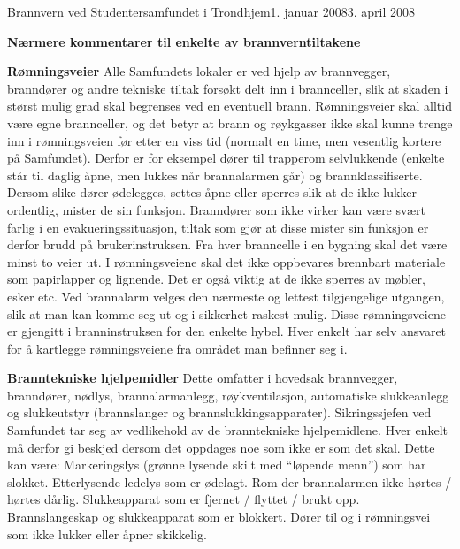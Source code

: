 \begin{instruks}{Brannvern ved Studentersamfundet i Trondhjem}{1. januar 2008}{3. april 2008}
    \begin{center}\textbf{Nærmere kommentarer til enkelte av brannverntiltakene} \end{center}
    \begin{description}
        \item \textbf{Rømningsveier} Alle Samfundets lokaler er ved hjelp av brannvegger, branndører og andre tekniske tiltak
                forsøkt delt inn i brannceller, slik at skaden i størst mulig grad skal begrenses ved en eventuell brann.
                Rømningsveier skal alltid være egne brannceller, og det betyr at brann og røykgasser ikke skal kunne trenge inn i
                rømningsveien før etter en viss tid (normalt en time, men vesentlig kortere på Samfundet). Derfor er for eksempel dører til
                trapperom selvlukkende (enkelte står til daglig åpne, men lukkes når brannalarmen går) og brannklassifiserte.
                Dersom slike dører ødelegges, settes åpne eller sperres slik at de ikke lukker ordentlig, mister de sin funksjon.
                Branndører som ikke virker kan være svært farlig i en evakueringssituasjon, tiltak som gjør at disse mister sin funksjon er
                derfor brudd på brukerinstruksen. Fra hver branncelle i en bygning skal det være minst to veier ut. I rømningsveiene skal
                det ikke oppbevares brennbart materiale som papirlapper og lignende. Det er også viktig at de ikke sperres av møbler,
                esker etc. Ved brannalarm velges den nærmeste og lettest tilgjengelige utgangen, slik at man kan
                komme seg ut og i sikkerhet raskest mulig. Disse rømningsveiene er gjengitt i branninstruksen for den enkelte hybel.
                Hver enkelt har selv ansvaret for å kartlegge rømningsveiene fra området man befinner seg i.

            \item \textbf{Branntekniske hjelpemidler} Dette omfatter i hovedsak brannvegger, branndører, nødlys, brannalarmanlegg, røykventilasjon,
                automatiske slukkeanlegg og slukkeutstyr (brannslanger og brannslukkingsapparater).
                Sikringssjefen ved Samfundet tar seg av vedlikehold av de branntekniske hjelpemidlene. Hver enkelt må derfor gi beskjed
                dersom det oppdages noe som ikke er som det skal. Dette kan være: Markeringslys (grønne lysende skilt med ``løpende menn'') som har slokket.
                Etterlysende ledelys som er ødelagt. Rom der brannalarmen ikke hørtes / hørtes dårlig. Slukkeapparat som er fjernet / flyttet / brukt opp.
                Brannslangeskap og slukkeapparat som er blokkert. Dører til og i rømningsvei som ikke lukker eller åpner skikkelig.
        \end{description}

   
\end{instruks}

